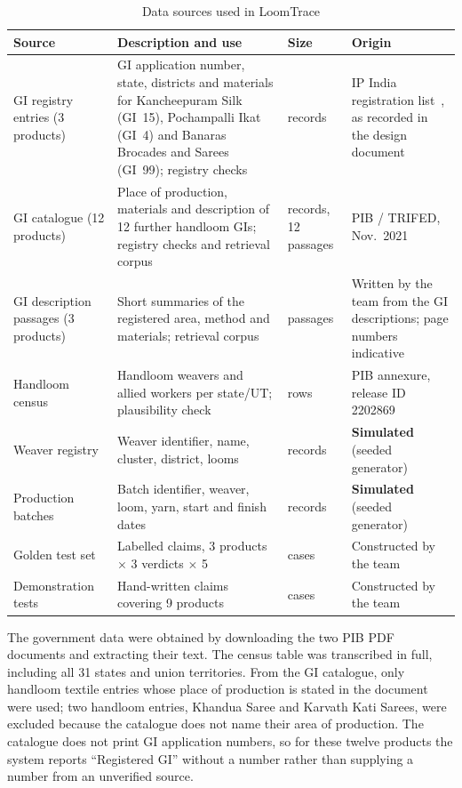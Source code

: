 \begin{table}[H]
\centering
\caption{Data sources used in LoomTrace}
\label{tab:data}
\small
\begin{tabularx}{\linewidth}{@{}>{\raggedright\arraybackslash}p{3.0cm} >{\raggedright\arraybackslash}X >{\raggedright\arraybackslash}p{2.1cm} >{\raggedright\arraybackslash}p{3.1cm}@{}}
\toprule
\textbf{Source} & \textbf{Description and use} & \textbf{Size} & \textbf{Origin} \\ \midrule
GI registry entries (3 products) & GI application number, state, districts and materials for Kancheepuram Silk (GI~15), Pochampalli Ikat (GI~4) and Banaras Brocades and Sarees (GI~99); registry checks & 3 records & IP India registration list~\cite{ipindia}, as recorded in the design document \\
GI catalogue (12 products) & Place of production, materials and description of 12 further handloom GIs; registry checks and retrieval corpus & 12 records, 12 passages & PIB / TRIFED, Nov.~2021~\cite{pibgi} \\
GI description passages (3 products) & Short summaries of the registered area, method and materials; retrieval corpus & 9 passages & Written by the team from the GI descriptions; page numbers indicative \\
Handloom census & Handloom weavers and allied workers per state/UT; plausibility check & 31 rows & PIB annexure, release ID 2202869~\cite{pibcensus} \\
Weaver registry & Weaver identifier, name, cluster, district, looms & 180 records & \textbf{Simulated} (seeded generator) \\
Production batches & Batch identifier, weaver, loom, yarn, start and finish dates & 360 records & \textbf{Simulated} (seeded generator) \\
Golden test set & Labelled claims, 3 products $\times$ 3 verdicts $\times$ 5 & 45 cases & Constructed by the team \\
Demonstration tests & Hand-written claims covering 9 products & 15 cases & Constructed by the team \\
\bottomrule
\end{tabularx}
\end{table}

The government data were obtained by downloading the two PIB PDF documents and extracting their text.
The census table was transcribed in full, including all 31 states and union territories. From the GI
catalogue, only handloom textile entries whose place of production is stated in the document were
used; two handloom entries, Khandua Saree and Karvath Kati Sarees, were excluded because the catalogue
does not name their area of production. The catalogue does not print GI application numbers, so for
these twelve products the system reports ``Registered GI'' without a number rather than supplying a
number from an unverified source.

